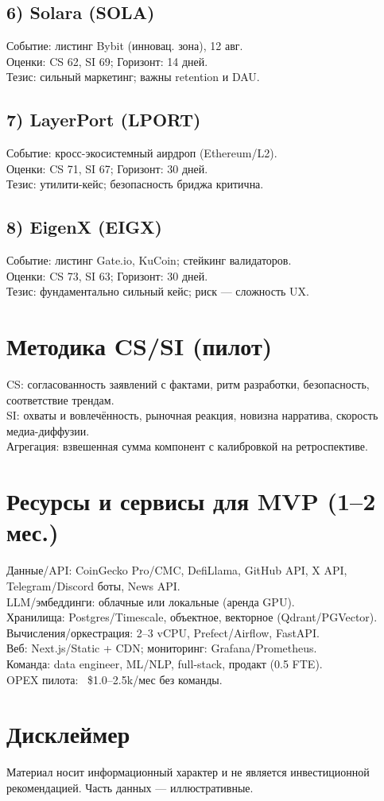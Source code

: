 \documentclass[12pt,a4paper]{article}
\begin{document}
\subsection*{6) Solara (SOLA)}
Событие: листинг Bybit (инновац. зона), 12 авг.\\
Оценки: CS 62, SI 69; Горизонт: 14 дней.\\
Тезис: сильный маркетинг; важны retention и DAU.

\subsection*{7) LayerPort (LPORT)}
Событие: кросс-экосистемный аирдроп (Ethereum/L2).\\
Оценки: CS 71, SI 67; Горизонт: 30 дней.\\
Тезис: утилити-кейс; безопасность бриджа критична.

\subsection*{8) EigenX (EIGX)}
Событие: листинг Gate.io, KuCoin; стейкинг валидаторов.\\
Оценки: CS 73, SI 63; Горизонт: 30 дней.\\
Тезис: фундаментально сильный кейс; риск --- сложность UX.

\section*{Методика CS/SI (пилот)}
CS: согласованность заявлений с фактами, ритм разработки, безопасность, соответствие трендам.\\
SI: охваты и вовлечённость, рыночная реакция, новизна нарратива, скорость медиа-диффузии.\\
Агрегация: взвешенная сумма компонент с калибровкой на ретроспективе.

\section*{Ресурсы и сервисы для MVP (1--2 мес.)}
Данные/API: CoinGecko Pro/CMC, DefiLlama, GitHub API, X API, Telegram/Discord боты, News API.\\
LLM/эмбеддинги: облачные или локальные (аренда GPU).\\
Хранилища: Postgres/Timescale, объектное, векторное (Qdrant/PGVector).\\
Вычисления/оркестрация: 2--3 vCPU, Prefect/Airflow, FastAPI.\\
Веб: Next.js/Static + CDN; мониторинг: Grafana/Prometheus.\\
Команда: data engineer, ML/NLP, full-stack, продакт (0.5 FTE).\\
OPEX пилота: ~\$1.0--2.5k/мес без команды.

\section*{Дисклеймер}
Материал носит информационный характер и не является инвестиционной рекомендацией. Часть данных --- иллюстративные.
\end{document}
